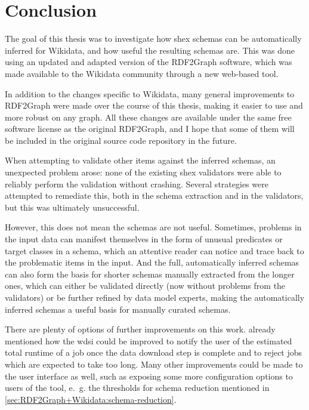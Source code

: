 
\chapter{Conclusion}
\label{ch:Conclusion}

The goal of this thesis was to investigate how \gls{shex} \glspl{schema} can be automatically inferred for \gls{Wikidata},
and how useful the resulting \glspl{schema} are.
This was done using an updated and adapted version of the \gls{RDF2Graph} software,
which was made available to the \gls{Wikidata} community
through a new web-based tool.

In addition to the changes specific to \gls{Wikidata},
many general improvements to \gls{RDF2Graph} were made over the course of this thesis,
making it easier to use and more robust on any graph.
All these changes are available under the same free software license as the original \gls{RDF2Graph},
and I hope that some of them will be included in the original source code repository in the future.

When attempting to validate other \glspl{item} against the inferred \glspl{schema},
an unexpected problem arose:
none of the existing \gls{shex} validators were able to reliably perform the validation without crashing.
Several strategies were attempted to remediate this,
both in the \gls{schema} extraction and in the validators,
but this was ultimately unsuccessful.

However, this does not mean the \glspl{schema} are not useful.
Sometimes, problems in the input data can manifest themselves
in the form of unusual \glspl{predicate} or target classes in a \gls{schema},
which an attentive reader can notice and trace back to the problematic \glspl{item} in the input.
And the full, automatically inferred \glspl{schema}
can also form the basis for shorter \glspl{schema} manually extracted from the longer ones,
which can either be validated directly
(now without problems from the validators)
or be further refined by data model experts, %
making the automatically inferred \glspl{schema} a useful basis for manually curated \glspl{schema}.

There are plenty of options of further improvements on this work.
 already mentioned how the \gls{wdsi} could be improved
to notify the user of the estimated total runtime of a job once the data download step is complete
and to reject jobs which are expected to take too long.
Many other improvements could be made to the user interface as well,
such as exposing some more configuration options to users of the tool,
e.~g. the thresholds for \gls{schema} reduction mentioned in \cref{sec:RDF2Graph+Wikidata:schema-reduction}.

